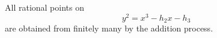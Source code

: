 \begin{proposition}
    All rational points on
\[
    y^2=x^3-h_2x-h_3
\]
    are obtained from finitely many by the addition process.
\end{proposition}
